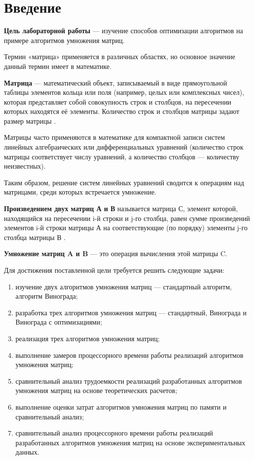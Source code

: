 \chapter*{Введение}
\textbf{Цель лабораторной работы} --- изучение способов оптимизации алгоритмов на примере алгоритмов умножения матриц.

Термин «матрица» применяется в различных областях, но основное значение данный термин имеет в математике.

\textbf{Матрица} --- математический объект, записываемый в виде прямоугольной таблицы элементов кольца или поля (например, целых или комплексных чисел), которая представляет собой совокупность строк и столбцов, на пересечении которых находятся её элементы. Количество строк и столбцов матрицы задают размер матрицы \cite{matrix}.

Матрицы часто применяются в математике для компактной записи систем линейных алгебраических или дифференциальных уравнений (количество строк матрицы соответствует числу уравнений, а количество столбцов --- количеству неизвестных).

Таким образом, решение систем линейных уравнений сводится к операциям над матрицами, среди которых встречается умножение.

\textbf{Произведением двух матриц А и В} называется матрица С, элемент которой, находящийся на пересечении i-й строки и j-го столбца, равен сумме произведений элементов i-й строки матрицы А на соответствующие (по порядку) элементы j-го столбца матрицы В \cite{matrix2}.

\textbf{Умножение матриц A и B} --- это операция вычисления этой матрицы C.

Для достижения поставленной цели требуется решить следующие задачи:
\begin{enumerate}[label={\arabic*)}]
    \item изучение двух алгоритмов умножения матриц --- стандартный алгоритм, алгоритм Винограда;
    \item разработка трех алгоритмов умножения матриц --- стандартный, Винограда и Винограда с оптимизациями;
    \item реализация трех алгоритмов умножения матриц;
    \item выполнение замеров процессорного времени работы реализаций алгоритмов умножения матриц;
	\item сравнительный анализ трудоемкости реализаций разработанных алгоритмов умножения матриц на основе теоретических расчетов;
	\item выполнение оценки затрат алгоритмов умножения матриц по памяти и сравнительный анализ;
	\item сравнительный анализ процессорного времени работы реализаций разработанных алгоритмов умножения матриц на основе экспериментальных данных.
\end{enumerate}